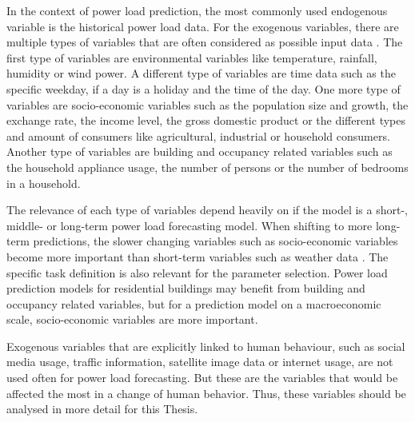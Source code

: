 In the context of power load prediction, the most commonly 
used endogenous variable is the historical power load data.
For the exogenous variables, there are multiple types of 
variables that are often considered as possible input data \cite{exogenousdata}
\cite{exogenousdata2}.
The first type of variables are environmental variables like temperature, 
rainfall, humidity or wind power. A different type of variables are time data
such as the specific weekday, if a day is a holiday and the time of the day.
One more type of variables are socio-economic variables such as the
population size and growth, the exchange rate, the income level,
the gross domestic product or the different types and amount 
of consumers like agricultural, industrial or household consumers.
Another type of variables are building and occupancy related variables such
as the household appliance usage,
the number of persons or the number of bedrooms in a household.

The relevance of each type of variables depend heavily on if the model is
a short-, middle- or long-term power load forecasting model. When shifting to more 
long-term predictions, the slower changing variables such as socio-economic
variables become more important than short-term variables such as weather data 
\cite{loadforecastingtimedependency2}\cite{loadforecastingtimedependency}.
The specific task definition is also relevant for the parameter selection.
Power load prediction models for residential buildings may benefit from 
building and occupancy related variables, but for a prediction model on a 
macroeconomic scale, socio-economic variables are more important.

Exogenous variables that are explicitly linked to human behaviour, 
such as social media usage, traffic information, satellite image data or 
internet usage, are not used often for power load forecasting. 
But these are the variables that would be affected the most in a change of 
human behavior. Thus, these variables should be analysed in more detail 
for this Thesis.

